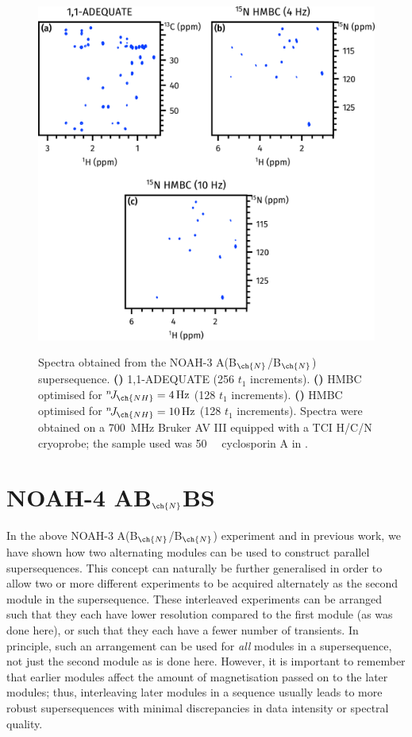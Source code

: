 \documentclass[a4paper,12pt]{article}
\newcommand{\nitrogen}{\ch{^{15}N}}
\newcommand{\njnh}{{}^n\!J_{\ch{NH}}}
\newcommand*{\cyclo}{Spectra were obtained on a \SI{700}{\MHz} Bruker AV III equipped with a TCI H/C/N cryoprobe; the sample used was \SI{50}{\milli\molar} cyclosporin A in \ch{C6D6}.}
\newcommand{\abnbn}{NOAH-3 A(B$_{\ch{N}}$/B$_{\ch{N}}$)}
\begin{document}
\begin{refsection}
\begin{figure}[ht]
    \centering
    \includegraphics[]{abb.png}%
    {\label{fig:abb_adeq}}
    {\label{fig:abb_n_hmbc1}}
    {\label{fig:abb_n_hmbc2}}
    \caption{
        Spectra obtained from the \abnbn{} supersequence.
        \textbf{()} 1,1-ADEQUATE (256 $t_1$ increments).
        \textbf{()} \nitrogen{} HMBC optimised for $\njnh = \SI{4}{Hz}$ (128 $t_1$ increments).
        \textbf{()} \nitrogen{} HMBC optimised for $\njnh = \SI{10}{Hz}$ (128 $t_1$ increments).
        \cyclo{}
    }
    \label{fig:abb}
\end{figure}

\section{NOAH-4 AB\texorpdfstring{$_{\ch{N}}$}{n}BS}

In the above \abnbn{} experiment and in previous work,\autocite{Kupce2021JACSA} we have shown how two alternating modules can be used to construct parallel supersequences.
This concept can naturally be further generalised in order to allow two or more different experiments to be acquired alternately as the second module in the supersequence.
These interleaved experiments can be arranged such that they each have lower resolution compared to the first module (as was done here), or such that they each have a fewer number of transients.
In principle, such an arrangement can be used for \textit{all} modules in a supersequence, not just the second module as is done here.
However, it is important to remember that earlier modules affect the amount of magnetisation passed on to the later modules; thus, interleaving later modules in a sequence usually leads to more robust supersequences with minimal discrepancies in data intensity or spectral quality.


\end{refsection}
\end{document}
